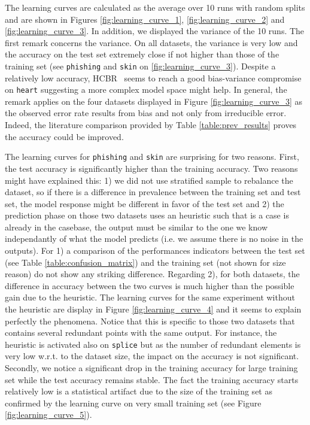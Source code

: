 \documentclass[preprint,12pt]{elsarticle}
\def\HCBR{{\sc HCBR}}
\theoremstyle{definition}
\begin{document}
The learning curves are calculated as the average over 10 runs with random splits and are shown in Figures \ref{fig:learning_curve_1}, \ref{fig:learning_curve_2} and \ref{fig:learning_curve_3}. In addition, we displayed the variance of the 10 runs. The first remark concerns the variance. On all datasets, the variance is very low and the accuracy on the test set extremely close if not higher than those of the training set (see \texttt{phishing} and \texttt{skin} on \ref{fig:learning_curve_3}). Despite a relatively low accuracy, \HCBR~ seems to reach a good bias-variance compromise on \texttt{heart} suggesting a more complex model space might help. In general, the remark applies on the four datasets displayed in Figure \ref{fig:learning_curve_3} as the observed error rate results from bias and not only from irreducible error. Indeed, the literature comparison provided by Table \ref{table:prev_results} proves the accuracy could be improved.

The learning curves for \texttt{phishing} and \texttt{skin} are surprising for two reasons. First, the test accuracy is significantly higher than the training accuracy. Two reasons might have explained this: 1) we did not use stratified sample to rebalance the dataset, so if there is a difference in prevalence between the training set and test set, the model response might be different in favor of the test set and 2) the prediction phase on those two datasets uses an heuristic such that is a case is already in the casebase, the output must be similar to the one we know independantly of what the model predicts (i.e. we assume there is no noise in the outputs). For 1) a comparison of the performances indicators between the test set (see Table \ref{table:confusion_matrix}) and the training set (not shown for size reason) do not show any striking difference. Regarding 2), for both datasets, the difference in accuracy between the two curves is much higher than the possible gain due to the heuristic. The learning curves for the same experiment without the heuristic are display in Figure \ref{fig:learning_curve_4} and it seems to explain perfectly the phenomena. Notice that this is specific to those two datasets that contains several redundant points with the same output. For instance, the heuristic is activated also on \texttt{splice} but as the number of redundant elements is very low w.r.t. to the dataset size, the impact on the accuracy is not significant.
Secondly, we notice a significant drop in the training accuracy for large training set while the test accuracy remains stable. The fact the training accuracy starts relatively low is a statistical artifact due to the size of the training set as confirmed by the learning curve on very small training set (see Figure \ref{fig:learning_curve_5}).
\end{document}
